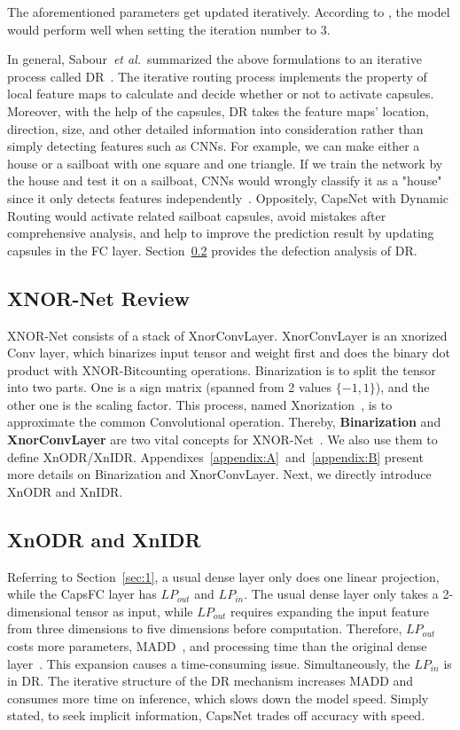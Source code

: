 \documentclass[sn-mathphys,iicol,Numbered]{sn-jnl}
\newcommand{\etal}{\textit{et al.}}
\begin{document}
The aforementioned parameters get updated iteratively. According to \cite{A1_caps}, the model would perform well when setting the iteration number to 3.

In general, Sabour~\etal~summarized the above formulations to an iterative process called DR~\citep{A1_caps}. The iterative routing process implements the property of local feature maps to calculate and decide whether or not to activate capsules. Moreover, with the help of the capsules, DR takes the feature maps' location, direction, size, and other detailed information into consideration rather than simply detecting features such as CNNs. For example, we can make either a house or a sailboat with one square and one triangle. If we train the network by the house and test it on a sailboat, CNNs would wrongly classify it as a "house" since it only detects features independently~\cite{A65_Boat_House}. Oppositely, CapsNet with Dynamic Routing would activate related sailboat capsules, avoid mistakes after comprehensive analysis, and help to improve the prediction result by updating capsules in the FC layer. Section~\ref{sec:3.3} provides the defection analysis of DR.

\subsection{XNOR-Net Review} \label{sec:3.2}
 
XNOR-Net consists of a stack of XnorConvLayer. XnorConvLayer is an xnorized Conv layer, which binarizes input tensor and weight first and does the binary dot product with XNOR-Bitcounting operations. Binarization is to split the tensor into two parts. One is a sign matrix (spanned from 2 values $\{-1, 1\}$), and the other one is the scaling factor. This process, named Xnorization~\cite{A2_xnor}, is to approximate the common Convolutional operation. Thereby, \textbf{Binarization} and \textbf{XnorConvLayer} are two vital concepts for XNOR-Net~\cite{A2_xnor}. We also use them to define XnODR/XnIDR. Appendixes~\ref{appendix:A}~and~\ref{appendix:B} present more details on Binarization and XnorConvLayer. Next, we directly introduce XnODR and XnIDR. 

\subsection{XnODR and XnIDR} \label{sec:3.3}

Referring to Section~\ref{sec:1}, a usual dense layer only does one linear projection, while the CapsFC layer has $LP_{out}$ and $LP_{in}$. The usual dense layer only takes a 2-dimensional tensor as input, while $LP_{out}$ requires expanding the input feature from three dimensions to five dimensions before computation. Therefore, $LP_{out}$ costs more parameters, MADD~\cite{A18_MBV2}, and processing time than the original dense layer~\cite{A18_MBV2}. This expansion causes a time-consuming issue. Simultaneously, the $LP_{in}$ is in DR. The iterative structure of the DR mechanism increases MADD and consumes more time on inference, which slows down the model speed. Simply stated, to seek implicit information, CapsNet trades off accuracy with speed.
\end{document}
